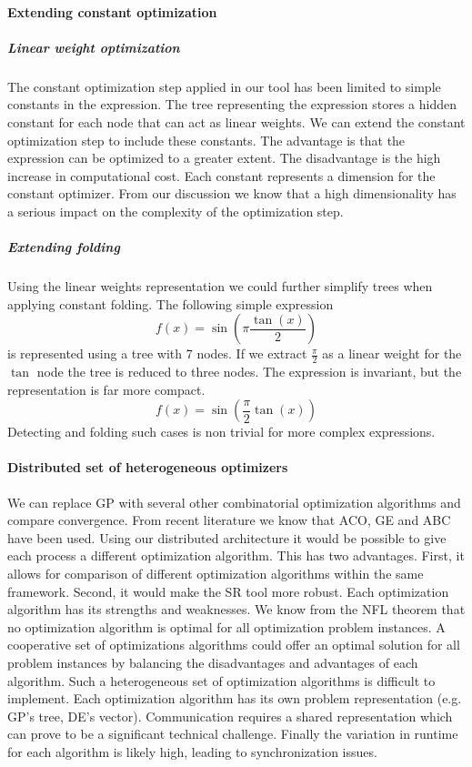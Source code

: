 \paragraph{Extending constant optimization}
\subparagraph{Linear weight optimization}
The constant optimization step applied in our tool has been limited to simple constants in the expression. The tree representing the expression stores a hidden constant for each node that can act as linear weights. We can extend the constant optimization step to include these constants. The advantage is that the expression can be optimized to a greater extent. The disadvantage is the high increase in computational cost. Each constant represents a dimension for the constant optimizer. From our discussion we know that a high dimensionality has a serious impact on the complexity of the optimization step. 
\subparagraph{Extending folding}
Using the linear weights representation we could further simplify trees when applying constant folding. The following simple expression
\[
f(x) = \sin( \pi \frac{\tan(x)}{2})
\]
is represented using a tree with 7 nodes. If we extract $\frac{\pi}{2}$ as a linear weight for the $\tan$ node the tree is reduced to three nodes. The expression is invariant, but the representation is far more compact.
\[
f(x) = \sin( \frac{\pi}{2} \tan(x))
\]
Detecting and folding such cases is non trivial for more complex expressions.

\paragraph{Distributed set of heterogeneous optimizers}
We can replace GP with several other combinatorial optimization algorithms and compare convergence. From recent literature we know that ACO, GE and ABC have been used. Using our distributed architecture it would be possible to give each process a different optimization algorithm. This has two advantages. First, it allows for comparison of different optimization algorithms within the same framework. Second, it would make the SR tool more robust. Each optimization algorithm has its strengths and weaknesses. We know from the NFL theorem that no optimization algorithm is optimal for all optimization problem instances. A cooperative set of optimizations algorithms could offer an optimal solution for all problem instances by balancing the disadvantages and advantages of each algorithm. Such a heterogeneous set of optimization algorithms is difficult to implement. Each optimization algorithm has its own problem representation (e.g. GP's tree, DE's vector). Communication requires a shared representation which can prove to be a significant technical challenge. Finally the variation in runtime for each algorithm is likely high, leading to synchronization issues.

